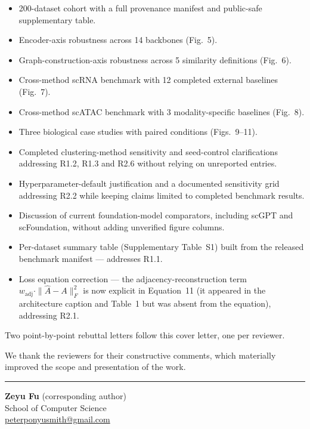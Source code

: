 \documentclass[11pt]{article}
\begin{document}
\begin{itemize}
  \item 200-dataset cohort with a full provenance manifest and public-safe
        supplementary table.
  \item Encoder-axis robustness across 14 backbones (Fig.~5).
  \item Graph-construction-axis robustness across 5 similarity definitions
        (Fig.~6).
  \item Cross-method scRNA benchmark with 12 completed external baselines
        (Fig.~7).
  \item Cross-method scATAC benchmark with 3 modality-specific baselines
        (Fig.~8).
  \item Three biological case studies with paired conditions (Figs.~9--11).
  \item Completed clustering-method sensitivity and seed-control clarifications
        addressing R1.2, R1.3 and R2.6 without relying on unreported entries.
  \item Hyperparameter-default justification and a documented sensitivity grid
        addressing R2.2 while keeping claims limited to completed benchmark
        results.
  \item Discussion of current foundation-model comparators, including scGPT and
        scFoundation, without adding unverified figure columns.
  \item Per-dataset summary table (Supplementary Table~S1) built from the
        released benchmark manifest --- addresses R1.1.
  \item Loss equation correction --- the adjacency-reconstruction term
        $w_{\mathrm{adj}} \cdot \|\hat{A} - A\|^2_F$ is now explicit in
        Equation~11 (it appeared in the architecture caption and Table~1 but
        was absent from the equation), addressing R2.1.
\end{itemize}

Two point-by-point rebuttal letters follow this cover letter, one per reviewer.

We thank the reviewers for their constructive comments, which materially
improved the scope and presentation of the work.

\vspace{16pt}
\noindent\textcolor{rrheader}{\rule{\linewidth}{0.4pt}}
\vspace{6pt}

\noindent
{\sffamily\bfseries Zeyu Fu} \quad (corresponding author)\\
{\small School of Computer Science\\
\href{mailto:peterponyusmith@gmail.com}{peterponyusmith@gmail.com}}

\vspace{4pt}
\end{document}
